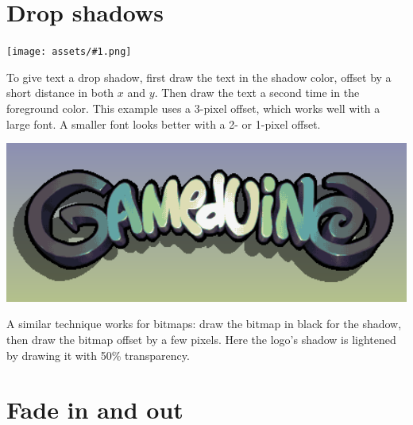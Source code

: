 \documentclass[10pt]{book}
\newcommand{\png}[1]{
\begin{center}
\texttt{[image: assets/\#1.png]}
\end{center}
}
\begin{document}
\begin{CJK}{UTF8}{gkai}
\newpage
\section{Drop shadows}
\png{0025}
To give text a drop shadow,
first draw the text in the shadow color, offset by a short distance in both $x$ and $y$.
Then draw the text a second time in the foreground color.
This example uses a 3-pixel offset, which works well with a large font.
A smaller font looks better with a 2- or 1-pixel offset.

\noindent
\begin{minipage}[][][t]{0.45\textwidth}
\includegraphics[width=1.0\textwidth]{assets/logodrop.png}
\end{minipage}
\begin{minipage}[][][t]{0.55\textwidth}
A similar technique works for bitmaps: draw the bitmap in black for the shadow, then draw the bitmap
offset by a few pixels.
Here the logo's shadow is lightened by drawing it with 50\% transparency.
\end{minipage}

\newpage
\section{Fade in and out}


\end{CJK}
\end{document}

